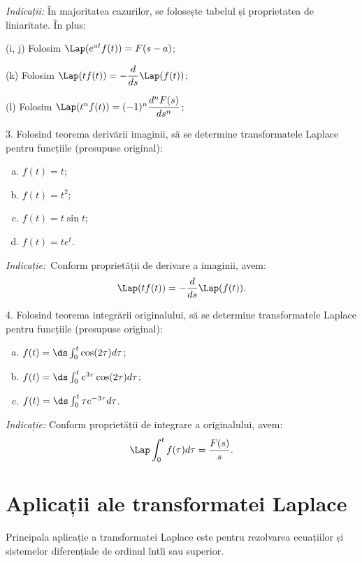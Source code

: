 \emph{Indicații:} În majoritatea cazurilor, se folosește tabelul și proprietatea de liniaritate.
În plus:

(i, j) Folosim $ \Lap (e^{at} f(t)) = F(s - a) $;

(k) Folosim $ \Lap (t f(t)) = -\dfrac{d}{ds} \Lap(f(t)) $;

(l) Folosim $ \Lap(t^n f(t)) = (-1)^n \dfrac{d^n F(s)}{ds^n} $;

\vspace{0.3cm}

3. Folosind teorema derivării imaginii, să se determine transformatele Laplace pentru funcțiile
(presupuse original):
\begin{enumerate}[(a)]
    \item $ f(t) = t $;
    \item $ f(t) = t^2 $;
    \item $ f(t) = t\sin t $;
    \item $ f(t) = te^t $.
\end{enumerate}

\emph{Indicație:} Conform proprietății de derivare a imaginii, avem:
\[
    \Lap (t f(t)) = -\frac{d}{ds} \Lap (f(t)).
\]

\vspace{0.3cm}

4. Folosind teorema integrării originalului, să se determine transformatele Laplace pentru
funcțiile (presupuse original):
\begin{enumerate}[(a)]
    \item $ f(t) = \ds\int_0^t \cos (2\tau) d\tau $;
    \item $ f(t) = \ds\int_0^t e^{3 \tau} \cos(2 \tau) d\tau $;
    \item $ f(t) = \ds\int_0^t \tau e^{-3\tau} d\tau $.
\end{enumerate}

\emph{Indicație:} Conform proprietății de integrare a originalului,
avem:
\[
    \Lap \int_0^t f(\tau) d\tau = \frac{F(s)}{s}.
\]



\section{Aplicații ale transformatei Laplace}

Principala aplicație a transformatei Laplace este pentru rezolvarea ecuațiilor și
sistemelor diferențiale de ordinul întîi sau superior.

